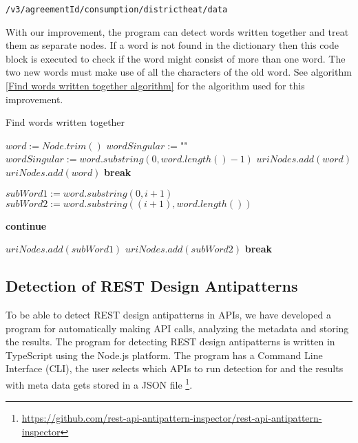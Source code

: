 \vspace{2mm}
\texttt{/v3/{agreementId}/consumption/districtheat/data}

\vspace{2mm}
With our improvement, the program can detect words written together and treat them as separate nodes. If a word is not found in the dictionary then this code block is executed to check if the word might consist of more than one word. The two new words must make use of all the characters of the old word. See algorithm \ref{Find words written together algorithm} for the algorithm used for this improvement.

\begin{algorithm}
\caption{Find words written together}
\begin{algorithmic}
\State $word := Node.trim()$
\State $wordSingular := $""$ $
    \State $wordSingular := word.substring(0, word.length() - 1)$
\EndIf
{}
    \State $uriNodes.add(word)$
\Else
{}
        \State $uriNodes.add(word)$
        \State \textbf{break}
    \EndIf
    
    \State $subWord1 := word.substring(0, i + 1)$
    \State $subWord2 := word.substring((i + 1), word.length())$
    
        \State \textbf{continue}
    \EndIf
    
        \State $uriNodes.add(subWord1)$
        \State $uriNodes.add(subWord2)$
        \State \textbf{break}
    \EndIf
\EndFor
\EndIf
\end{algorithmic}
\label{Find words written together algorithm}
\end{algorithm}

\clearpage

\subsection{Detection of REST Design Antipatterns}

To be able to detect REST design antipatterns in APIs, we have developed a program for automatically making API calls, analyzing the metadata and storing the results. 
The program for detecting REST design antipatterns is written in TypeScript using the Node.js platform. The program has a Command Line Interface (CLI), the user selects which APIs to run detection for and the results with meta data gets stored in a JSON file \footnote{\url{https://github.com/rest-api-antipattern-inspector/rest-api-antipattern-inspector}}. 

